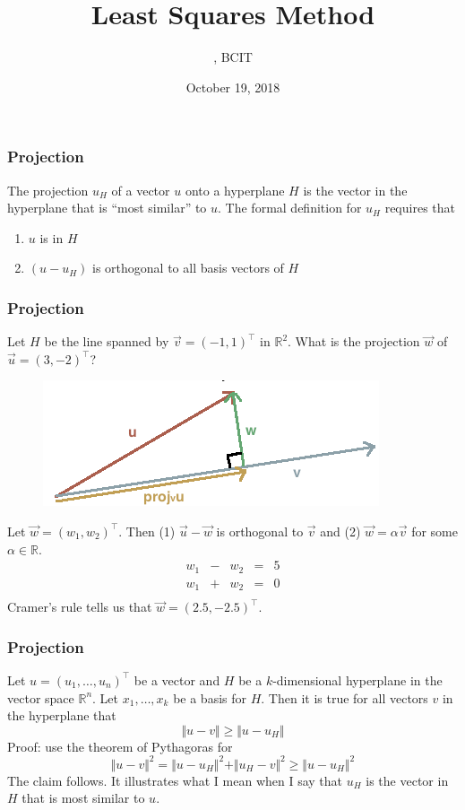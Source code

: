 \documentclass[xcolor=dvipsnames]{beamer}
\title{Least Squares Method}
\subtitle{{\CourseNumber}, BCIT}
\author{\CourseName}
\date{October 19, 2018}
\begin{document}
\begin{frame}
  \titlepage
\end{frame}

\begin{frame}
  \frametitle{Projection}
  The \alert{projection} $u_{H}$ of a vector $u$ onto a hyperplane $H$
  is the vector in the hyperplane that is ``most similar'' to $u$. The
  formal definition for $u_{H}$ requires that
  \begin{enumerate}
  \item $u$ is in $H$
  \item $(u-u_{H})$ is orthogonal to all basis vectors of $H$
  \end{enumerate}
\end{frame}

\begin{frame}
  \frametitle{Projection}
   Let $H$ be the line spanned by
  $\vec{v}=(-1,1)^{\intercal}$ in $\mathbb{R}^{2}$. What is the
  projection $\vec{w}$ of $\vec{u}=(3,-2)^{\intercal}$?
    \begin{figure}[h]
    \includegraphics[scale=0.32]{./diagrams/project.png}
  \end{figure}
  Let $\vec{w}=(w_{1},w_{2})^{\intercal}$. Then (1) $\vec{u}-\vec{w}$
  is orthogonal to $\vec{v}$ and (2) $\vec{w}=\alpha\vec{v}$ for some
  $\alpha\in\mathbb{R}$.
  \begin{equation}
    \label{eq:vorahcat}
    \begin{array}{ccccc}
      w_{1}&-&w_{2}&=&5 \\
      w_{1}&+&w_{2}&=&0 \\
    \end{array}
  \end{equation}
Cramer's rule tells us that $\vec{w}=(2.5,-2.5)^{\intercal}$. 
\end{frame}

\begin{frame}
  \frametitle{Projection}
  Let $u=(u_{1},{\ldots},u_{n})^{\intercal}$ be a vector and $H$ be a
  $k$-dimensional hyperplane in the vector space $\mathbb{R}^{n}$. Let
  $x_{1},{\ldots},x_{k}$ be a basis for $H$. Then it is true for all
  vectors $v$ in the hyperplane that
  \begin{equation}
    \label{eq:ahdoogoh}
    \Vert{}u-v\Vert\geq\Vert{}u-u_{H}\Vert
  \end{equation}
  Proof: use the theorem of Pythagoras for
  \begin{equation}
    \label{eq:yoochaev}
    \Vert{}u-v\Vert^{2}=\Vert{}u-u_{H}\Vert^{2}+\Vert{}u_{H}-v\Vert^{2}\geq\Vert{}u-u_{H}\Vert^{2}
  \end{equation}
The claim follows. It illustrates what I mean when I say that $u_{H}$
is the vector in $H$ that is most similar to $u$. 
\end{frame}
\end{document}
